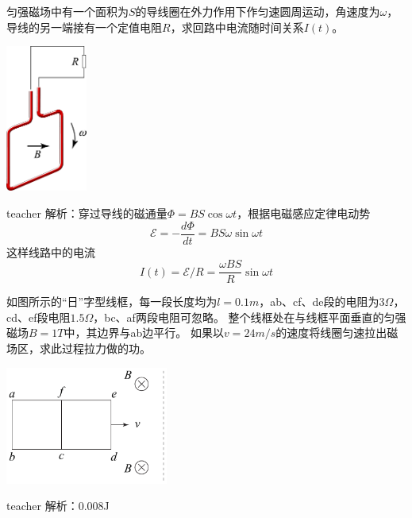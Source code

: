 \begin{example}
匀强磁场中有一个面积为$S$的导线圈在外力作用下作匀速圆周运动，角速度为$\omega$，
导线的另一端接有一个定值电阻$R$，求回路中电流随时间关系$I(t)$。
\begin{flushright}
\includegraphics[width = 0.2\textwidth]{images/mag-16.pdf} 
\end{flushright}

\begin{taggedblock}{teacher}
\noindent
解析：穿过导线的磁通量$\Phi = BS\cos\omega t$，根据电磁感应定律电动势
\[
\mathcal{E} = -\frac{d\Phi}{dt} = BS\omega\sin\omega t
\]
这样线路中的电流
\[
I(t) = \mathcal{E}/R = \frac{\omega BS}{R}\sin\omega t
\]
\end{taggedblock}
\end{example}



\begin{example}
如图所示的“日”字型线框，每一段长度均为$l=0.1\unit{m}$，ab、cf、de段的电阻为$3\Omega$，cd、ef段电阻$1.5\Omega$，bc、af两段电阻可忽略。
整个线框处在与线框平面垂直的匀强磁场$B=1\unit{T}$中，其边界与ab边平行。
如果以$v=24\unit{m/s}$的速度将线圈匀速拉出磁场区，求此过程拉力做的功。
\begin{flushright}
\includegraphics[width = 0.4\textwidth]{images/mag-43.pdf} 
\end{flushright}

\begin{taggedblock}{teacher}
\noindent
解析：0.008J
\end{taggedblock}
\end{example}

